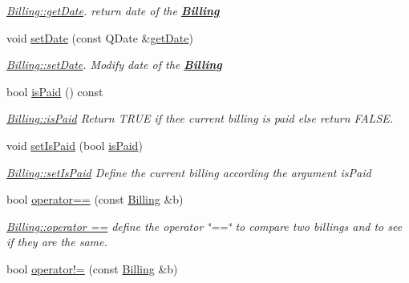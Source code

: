 \begin{DoxyCompactItemize}
\begin{DoxyCompactList}\small\item\em \hyperlink{classModels_1_1Billing_af0d1f0132d0902fb96456d0a9018b701}{Billing\-::get\-Date}. return date of the {\bfseries \hyperlink{classModels_1_1Billing}{Billing}} \end{DoxyCompactList}\item 
void \hyperlink{classModels_1_1Billing_ae8db0fe5fe273fad31e2f846b5b891cb}{set\-Date} (const Q\-Date \&\hyperlink{classModels_1_1Billing_af0d1f0132d0902fb96456d0a9018b701}{get\-Date})
\begin{DoxyCompactList}\small\item\em \hyperlink{classModels_1_1Billing_ae8db0fe5fe273fad31e2f846b5b891cb}{Billing\-::set\-Date}. Modify {\itshape date} of the {\bfseries \hyperlink{classModels_1_1Billing}{Billing}} \end{DoxyCompactList}\item 
bool \hyperlink{classModels_1_1Billing_ab2f9bd62e920be8c68313e35bbcabd46}{is\-Paid} () const 
\begin{DoxyCompactList}\small\item\em \hyperlink{classModels_1_1Billing_ab2f9bd62e920be8c68313e35bbcabd46}{Billing\-::is\-Paid} Return T\-R\-U\-E if thee current billing is paid else return F\-A\-L\-S\-E. \end{DoxyCompactList}\item 
void \hyperlink{classModels_1_1Billing_a99cf8c1b7435fe268b8fa9257cad6c56}{set\-Is\-Paid} (bool \hyperlink{classModels_1_1Billing_ab2f9bd62e920be8c68313e35bbcabd46}{is\-Paid})
\begin{DoxyCompactList}\small\item\em \hyperlink{classModels_1_1Billing_a99cf8c1b7435fe268b8fa9257cad6c56}{Billing\-::set\-Is\-Paid} Define the current billing according the argument {\itshape is\-Paid} \end{DoxyCompactList}\item 
bool \hyperlink{classModels_1_1Billing_af3d8818a1e00eaa707058567fccf045b}{operator==} (const \hyperlink{classModels_1_1Billing}{Billing} \&b)
\begin{DoxyCompactList}\small\item\em \hyperlink{classModels_1_1Billing_af3d8818a1e00eaa707058567fccf045b}{Billing\-::operator ==} define the operator \char`\"{}==\char`\"{} to compare two billings and to see if they are the same. \end{DoxyCompactList}\item 
bool \hyperlink{classModels_1_1Billing_ae6ff88e05384718d57be1be38f250a52}{operator!=} (const \hyperlink{classModels_1_1Billing}{Billing} \&b)

\end{DoxyCompactItemize}
